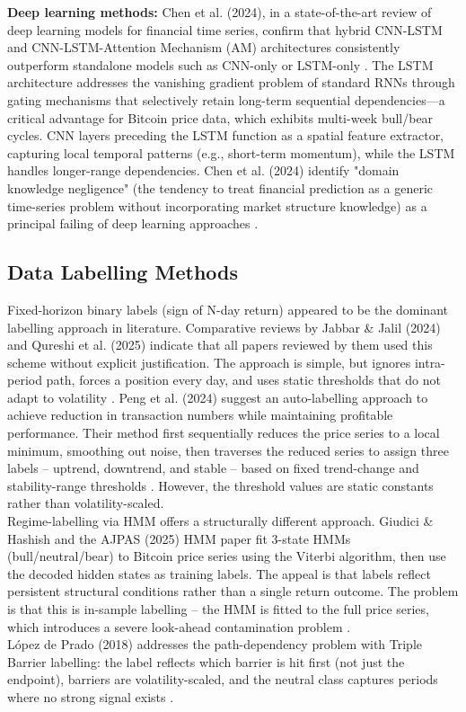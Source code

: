 \noindent \textbf{Deep learning methods:} Chen et al. (2024), in a state-of-the-art review of deep learning models for financial time series, confirm that hybrid CNN-LSTM and CNN-LSTM-Attention Mechanism (AM) architectures consistently outperform standalone models such as CNN-only or LSTM-only \cite{chenDeepLearningFinancial2024}. The LSTM architecture \cite{hochreiterLongShortTermMemory1997} addresses the vanishing gradient problem of standard RNNs through gating mechanisms that selectively retain long-term sequential dependencies—a critical advantage for Bitcoin price data, which exhibits multi-week bull/bear cycles. CNN layers preceding the LSTM function as a spatial feature extractor, capturing local temporal patterns (e.g., short-term momentum), while the LSTM handles longer-range dependencies. Chen et al. (2024) identify "domain knowledge negligence" (the tendency to treat financial prediction as a generic time-series problem without incorporating market structure knowledge) as a principal failing of deep learning approaches \cite{chenDeepLearningFinancial2024}.
\subsection{Data Labelling Methods}
Fixed-horizon binary labels (sign of N-day return) appeared to be the dominant labelling approach in literature. Comparative reviews by Jabbar \& Jalil (2024) and Qureshi et al. (2025) indicate that all papers reviewed by them used this scheme without explicit justification. The approach is simple, but ignores intra-period path, forces a position every day, and uses static thresholds that do not adapt to volatility \cite{qureshiEvaluatingMachineLearning2025, jabbarComprehensiveAnalysisMachine2024}.
Peng et al. (2024) suggest an auto-labelling approach to achieve reduction in transaction numbers while maintaining profitable performance. Their method first sequentially reduces the price series to a local minimum, smoothing out noise, then traverses the reduced series to assign three labels -- uptrend, downtrend, and stable -- based on fixed trend-change and stability-range thresholds \cite{pengAttentionbasedCNNLSTM2024}. However, the threshold values are static constants rather than volatility-scaled.\\
Regime-labelling via HMM offers a structurally different approach. Giudici \& Hashish and the AJPAS (2025) HMM paper fit 3-state HMMs (bull/neutral/bear) to Bitcoin price series using the Viterbi algorithm, then use the decoded hidden states as training labels. The appeal is that labels reflect persistent structural conditions rather than a single return outcome. The problem is that this is in-sample labelling – the HMM is fitted to the full price series, which introduces a severe look-ahead contamination problem \cite{machimboApplicationsHiddenMarkov2025}.\\
López de Prado (2018) addresses the path-dependency problem with Triple Barrier labelling: the label reflects which barrier is hit first (not just the endpoint), barriers are volatility-scaled, and the neutral class captures periods where no strong signal exists \cite{lopezdepradoAdvancesFinancialMachine2018}.
